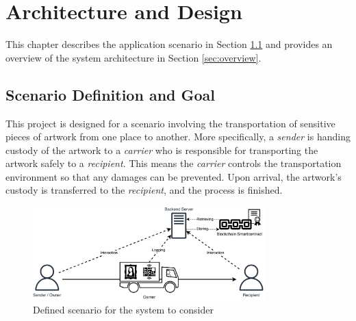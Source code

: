 \chapter{Architecture and Design}
\label{chap:architecture_design}
This chapter describes the application scenario in Section \ref{sec:scenario_definition} and provides an overview of the system architecture in Section \ref{sec:overview}.

\section{Scenario Definition and Goal}
\label{sec:scenario_definition}
This project is designed for a scenario involving the transportation of sensitive pieces of artwork from one place to another. More specifically, a \textit{sender} is handing custody of the artwork to a \textit{carrier} who is responsible for transporting the artwork safely to a \textit{recipient}. This means the \textit{carrier} controls the transportation environment so that any damages can be prevented. Upon arrival, the artwork's custody is transferred to the \textit{recipient}, and the process is finished.

\begin{figure}[ht]
    \label{fig:scenario}
    \centering
    \includegraphics[width=0.8\textwidth]{diagrams/scenario.drawio.pdf}
    \caption{Defined scenario for the system to consider}
\end{figure}


